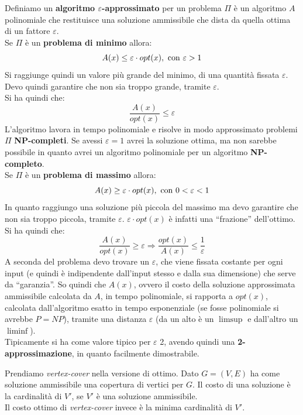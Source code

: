 \documentclass[a4paper,12pt, oneside]{book}
\begin{document}
\begin{definizione}
  Definiamo un \textbf{algoritmo $\varepsilon$-approssimato} per un problema
  $\Pi$ è un 
  algoritmo $A$ polinomiale che restituisce una soluzione ammissibile che dista
  da quella ottima di un fattore $\varepsilon$.\\
  Se $\Pi$ è un \textbf{problema di minimo} allora:
  \[A(x)\leq \varepsilon\cdot opt(x), \mbox{ \textnormal{con} }\varepsilon>1\]
  Si raggiunge quindi un valore più grande del minimo, di una quantità fissata
  $\varepsilon$. Devo quindi garantire che non sia troppo grande, tramite
  $\varepsilon$.\\
  Si ha quindi che:
  \[\frac{A(x)}{opt(x)}\leq \varepsilon\]
  L'algoritmo lavora in tempo polinomiale e risolve in modo approssimato
  problemi $\Pi$ \textbf{NP-completi}. Se avessi $\varepsilon=1$ avrei la
  soluzione ottima, ma non sarebbe possibile in quanto avrei un algoritmo
  polinomiale per un algoritmo \textbf{NP-completo}.\\
  Se $\Pi$ è un \textbf{problema di massimo} allora:
  \[A(x)\geq \varepsilon\cdot opt(x), \mbox{ \textnormal{con} }0<\varepsilon<1\]
  In quanto raggiungo una soluzione più piccola del massimo ma devo garantire
  che non sia troppo piccola, tramite $\varepsilon$. $\varepsilon\cdot opt(x)$ è
  infatti una ``frazione'' dell'ottimo.\\
  Si ha quindi che:
  \[\frac{A(x)}{opt(x)}\geq \varepsilon\Longrightarrow\frac{opt(x)}{A(x)}\leq
    \frac{1}{\varepsilon}\]
  A seconda del problema devo trovare un $\varepsilon$, che viene fissata
  costante per ogni input (e quindi è indipendente dall'input stesso e dalla sua
  dimensione) che serve da ``garanzia''. So quindi che $A(x)$, ovvero il costo
  della soluzione approssimata ammissibile calcolata da $A$, in tempo
  polinomiale, si rapporta a $opt(x)$, calcolata dall'algoritmo esatto in tempo
  esponenziale (se fosse polinomiale si avrebbe $P=NP$), tramite una distanza
  $\varepsilon$ (da un alto è un $\limsup$ e dall'altro un $\liminf$).\\
  Tipicamente si ha come valore tipico per $\varepsilon$ 2, avendo quindi
  una \textbf{2-approssimazione}, in quanto facilmente dimostrabile.
\end{definizione}
\begin{esempio}
  Prendiamo \textit{vertex-cover} nella versione di ottimo. Dato $G=(V,E)$ ha
  come soluzione ammissibile una copertura di vertici per $G$. Il costo di una
  soluzione è la cardinalità di $V'$, se $V'$ è una soluzione ammissibile.\\
  Il costo ottimo di \textit{vertex-cover} invece è la minima cardinalità di
  $V'$.
\end{esempio}
\end{document}
